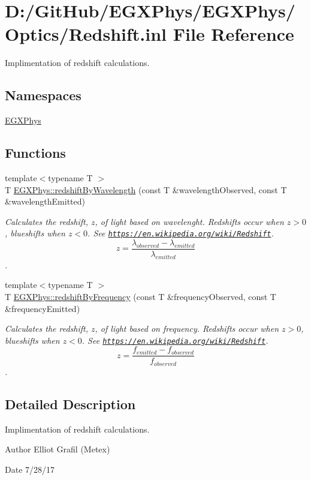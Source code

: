 \hypertarget{_redshift_8inl}{}\section{D\+:/\+Git\+Hub/\+E\+G\+X\+Phys/\+E\+G\+X\+Phys/\+Optics/\+Redshift.inl File Reference}
\label{_redshift_8inl}


Implimentation of redshift calculations.  


\subsection*{Namespaces}
\begin{DoxyCompactItemize}
\item 
 \mbox{\hyperlink{namespace_e_g_x_phys}{E\+G\+X\+Phys}}
\end{DoxyCompactItemize}
\subsection*{Functions}
\begin{DoxyCompactItemize}
\item 
{\footnotesize template$<$typename T $>$ }\\T \mbox{\hyperlink{group___optics_ga29300a13e34da35332ca2d447b5ce82d}{E\+G\+X\+Phys\+::redshift\+By\+Wavelength}} (const T \&wavelength\+Observed, const T \&wavelength\+Emitted)
\begin{DoxyCompactList}\small\item\em Calculates the redshift, $z$, of light based on wavelenght. Redshifts occur when $z > 0$, blueshifts when $z < 0$. See \href{https://en.wikipedia.org/wiki/Redshift}{\tt https\+://en.\+wikipedia.\+org/wiki/\+Redshift}. \[z=\frac{\lambda_{observed}-\lambda_{emitted}}{\lambda_{emitted}}\]. \end{DoxyCompactList}\item 
{\footnotesize template$<$typename T $>$ }\\T \mbox{\hyperlink{group___optics_gacc6d3b2922061214d64b89a4b8e3967a}{E\+G\+X\+Phys\+::redshift\+By\+Frequency}} (const T \&frequency\+Observed, const T \&frequency\+Emitted)
\begin{DoxyCompactList}\small\item\em Calculates the redshift, $z$, of light based on frequency. Redshifts occur when $z > 0$, blueshifts when $z < 0$. See \href{https://en.wikipedia.org/wiki/Redshift}{\tt https\+://en.\+wikipedia.\+org/wiki/\+Redshift}. \[z=\frac{f_{emitted}-f_{observed}}{f_{observed}}\]. \end{DoxyCompactList}\end{DoxyCompactItemize}


\subsection{Detailed Description}
Implimentation of redshift calculations. 

\begin{DoxyAuthor}{Author}
Elliot Grafil (Metex) 
\end{DoxyAuthor}
\begin{DoxyDate}{Date}
7/28/17 
\end{DoxyDate}
